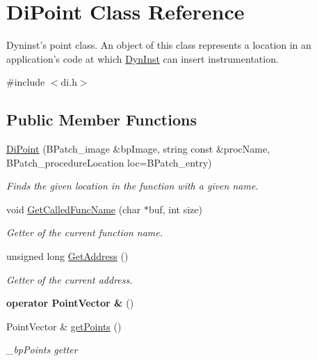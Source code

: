 \hypertarget{class_di_point}{\section{Di\-Point Class Reference}
\label{class_di_point}
}


Dyninst's point class. An object of this class represents a location in an application's code at which \hyperlink{class_dyn_inst}{Dyn\-Inst} can insert instrumentation.  




{\ttfamily \#include $<$di.\-h$>$}

\subsection*{Public Member Functions}
\begin{DoxyCompactItemize}
\item 
\hyperlink{class_di_point_a0cb0a2a951b711f680f51d7ca6719a83}{Di\-Point} (B\-Patch\-\_\-image \&bp\-Image, string const \&proc\-Name, B\-Patch\-\_\-procedure\-Location loc=B\-Patch\-\_\-entry)
\begin{DoxyCompactList}\small\item\em Finds the given location in the function with a given name. \end{DoxyCompactList}\item 
void \hyperlink{class_di_point_ad4a55eb8bb7e86dacfb443f7d374e3d0}{Get\-Called\-Func\-Name} (char $\ast$buf, int size)
\begin{DoxyCompactList}\small\item\em Getter of the current function name. \end{DoxyCompactList}\item 
unsigned long \hyperlink{class_di_point_ae15f39a73445e20c48d120a43527d354}{Get\-Address} ()
\begin{DoxyCompactList}\small\item\em Getter of the current address. \end{DoxyCompactList}\item 
\hypertarget{class_di_point_a51d22da20645cfd7f51552ac73628032}{{\bfseries operator Point\-Vector \&} ()}\label{class_di_point_a51d22da20645cfd7f51552ac73628032}

\item 
Point\-Vector \& \hyperlink{class_di_point_a592e02eeeb615a57729cb54c9b8cc19b}{get\-Points} ()
\begin{DoxyCompactList}\small\item\em \-\_\-bp\-Points getter \end{DoxyCompactList}\end{DoxyCompactItemize}



